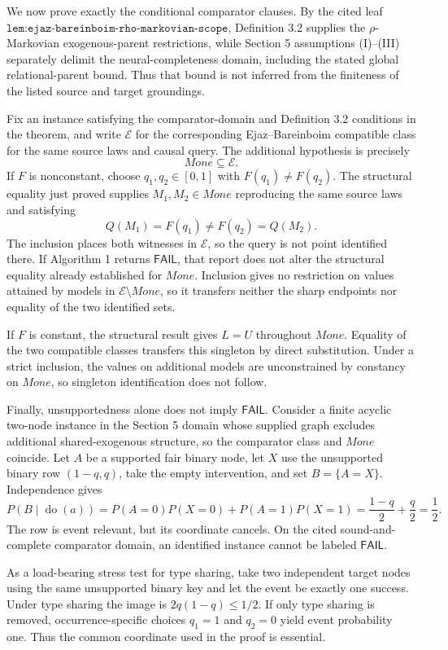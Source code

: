 We now prove exactly the conditional comparator clauses.  By the cited leaf \(\texttt{lem:ejaz-bareinboim-rho-markovian-scope}\), Definition 3.2 supplies the \(\rho\)-Markovian exogenous-parent restrictions, while Section 5 assumptions (I)--(III) separately delimit the neural-completeness domain, including the stated global relational-parent bound.  Thus that bound is not inferred from the finiteness of the listed source and target groundings.

Fix an instance satisfying the comparator-domain and Definition 3.2 conditions in the theorem, and write \(\mathcal E\) for the corresponding Ejaz--Bareinboim compatible class for the same source laws and causal query.  The additional hypothesis is precisely
\[
 Mone\subseteq\mathcal E.
\]
If \(F\) is nonconstant, choose \(q_1,q_2\in[0,1]\) with \(F(q_1)\neq F(q_2)\).  The structural equality just proved supplies \(M_1,M_2\in Mone\) reproducing the same source laws and satisfying
\[
 Q(M_1)=F(q_1)\neq F(q_2)=Q(M_2).
\]
The inclusion places both witnesses in \(\mathcal E\), so the query is not point identified there.  If Algorithm 1 returns \(\mathsf{FAIL}\), that report does not alter the structural equality already established for \(Mone\).  Inclusion gives no restriction on values attained by models in \(\mathcal E\setminus Mone\), so it transfers neither the sharp endpoints nor equality of the two identified sets.

If \(F\) is constant, the structural result gives \(L=U\) throughout \(Mone\).  Equality of the two compatible classes transfers this singleton by direct substitution.  Under a strict inclusion, the values on additional models are unconstrained by constancy on \(Mone\), so singleton identification does not follow.

Finally, unsupportedness alone does not imply \(\mathsf{FAIL}\).  Consider a finite acyclic two-node instance in the Section 5 domain whose supplied graph excludes additional shared-exogenous structure, so the comparator class and \(Mone\) coincide.  Let \(A\) be a supported fair binary node, let \(X\) use the unsupported binary row \((1-q,q)\), take the empty intervention, and set \(B=\{A=X\}\).  Independence gives
\[
 P(B\mid\operatorname{do}(a))
 =P(A=0)P(X=0)+P(A=1)P(X=1)
 =\frac{1-q}{2}+\frac q2=\frac12.
\]
The row is event relevant, but its coordinate cancels.  On the cited sound-and-complete comparator domain, an identified instance cannot be labeled \(\mathsf{FAIL}\).

As a load-bearing stress test for type sharing, take two independent target nodes using the same unsupported binary key and let the event be exactly one success.  Under type sharing the image is \(2q(1-q)\leq1/2\).  If only type sharing is removed, occurrence-specific choices \(q_1=1\) and \(q_2=0\) yield event probability one.  Thus the common coordinate used in the proof is essential.


